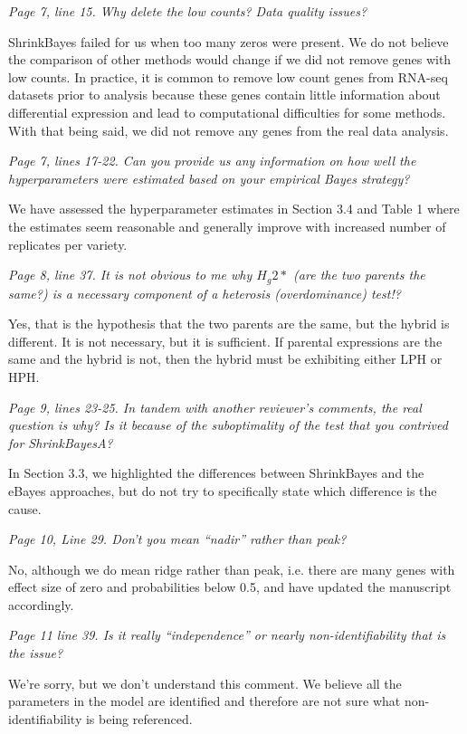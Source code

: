 \documentclass{article}
\newcommand{\comment}[1]{\textit{#1}}
\newcommand{\response}[1]{#1}
\begin{document}
\comment{Page 7, line 15.  Why delete the low counts?  Data quality issues?}

\response{ShrinkBayes failed for us when too many zeros were present. We do not believe the comparison of other methods would change if we did not remove genes with low counts.  In practice, it is common to remove low count genes from RNA-seq datasets prior to analysis because these genes contain little information about differential expression and lead to computational difficulties for some methods. With that being said, we did not remove any genes from the real data analysis.}

\comment{Page 7, lines 17-22.  Can you provide us any information on how well the hyperparameters were estimated based on your empirical Bayes strategy?}

\response{We have assessed the hyperparameter estimates in Section 3.4 and Table 1 where the estimates seem reasonable and generally improve with increased number of replicates per variety.}

\comment{Page 8, line 37.  It is not obvious to me why $H_g2*$ (are the two parents the same?) is a necessary component of a heterosis (overdominance) test!?}

\response{Yes, that is the hypothesis that the two parents are the same, but the hybrid is different. It is not necessary, but it is sufficient. If parental expressions are the same and the hybrid is not, then the hybrid must be exhibiting either LPH or HPH.}

\comment{Page 9, lines 23-25.  In tandem with another reviewer’s comments, the real question is why?  Is it because of the suboptimality of the test that you contrived for ShrinkBayesA?}

\response{In Section 3.3, we highlighted the differences between ShrinkBayes and the eBayes approaches, but do not try to specifically state which difference is the cause.}

\comment{Page 10, Line 29.  Don’t you mean “nadir” rather than peak?}

\response{No, although we do mean ridge rather than peak, i.e. there are many genes with effect size of zero and probabilities below 0.5, and have updated the manuscript accordingly.}

\comment{Page 11 line 39.  Is it really “independence” or nearly non-identifiability that is the issue?}

\response{We're sorry, but we don't understand this comment. We believe all the parameters in the model are identified and therefore are not sure what non-identifiability is being referenced.}
\end{document}
